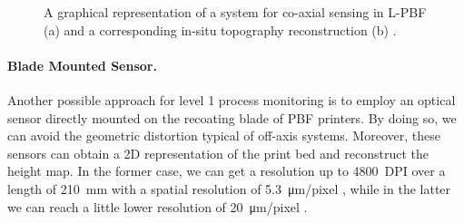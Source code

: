 \begin{figure}
    \centering
    \qquad
    \caption[Co-axial sensing and results.]{A graphical representation of a system for co-axial sensing in L-PBF \cite{colosimo_-machine_2020} (a) and a corresponding in-situ topography reconstruction (b) \cite{neef_low_2014}.}
\end{figure}
\paragraph{Blade Mounted Sensor.} Another possible approach for level 1 process monitoring is to employ an optical sensor directly mounted on the recoating blade of PBF printers. By doing so, we can avoid the geometric distortion typical of off-axis systems. Moreover, these sensors can obtain a 2D representation of the print bed and reconstruct the height map. In the former case, we can get a resolution up to \SI{4800}{DPI} over a length of \SI{210}{\milli\metre} with a spatial resolution of \SI{5.3}{\micro\metre / pixel} \cite{tan_phuc_high-resolution_2019}, while in the latter we can reach a little lower resolution of \SI{20}{\micro\metre / pixel} \cite{barrett_micron-level_2018}.
